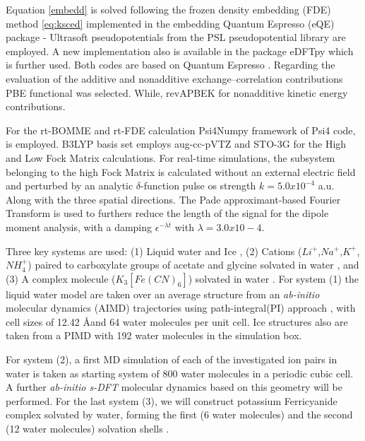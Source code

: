 \documentclass[notitlepage,12pt]{report}
\begin{document}
Equation \ref{embedd} is solved following the frozen density embedding (FDE) method \ref{eq:ksced} implemented in the embedding Quantum Espresso (eQE) package \supercite{genova2017eqe}- Ultrasoft pseudopotentials from the PSL pseudopotential library \supercite{corso2014comput} are employed. A new implementation also is available in the package eDFTpy\supercite{edftpy} which is further used. Both codes are based on Quantum Espresso \supercite{qe}. Regarding the evaluation of the additive and nonadditive exchange--correlation contributions PBE functional \supercite{perdew1996phys} was selected. While, revAPBEK \supercite{laricchia2011generalized} for nonadditive kinetic energy contributions. 

For the rt-BOMME and rt-FDE calculation Psi4Numpy\supercite{smith2018psi4numpy} framework of Psi4 code\supercite{smith2020psi4}, is employed. B3LYP basis set employs aug-cc-pVTZ and STO-3G for the High and Low Fock Matrix calculations. For real-time simulations, the subsystem belonging to the high Fock Matrix is calculated without an external electric field and perturbed by an analytic $\delta$-function pulse os strength $k=5.0x10^{-4}$ a.u. Along with the three spatial directions. The Pade approximant-based Fourier Transform is used to furthers reduce the length of the signal for the dipole moment analysis, with a damping $\epsilon^{-\lambda \dot{t}}$ with $\lambda=3.0x10-4$. 

Three key systems are used: (1) Liquid water\supercite{gaiduk2018electron} and Ice \supercite{bergmann2007nearest,zhovtobriukh2019x}, (2) Cations ($Li^{+}$,$Na^{+}$,$K^{+}$,$NH_4^{+}$) paired to carboxylate groups of acetate and glycine solvated in water \supercite{aziz2008cation}, and (3) A complex molecule ($K_3[Fe(CN)_6]$) solvated in water \supercite{zheng2018enabling}. For system (1) the liquid water model are taken over an average structure from an \textit{ab-initio} molecular dynamics (AIMD) trajectories using path-integral(PI) approach \supercite{gaiduk2018electron}, with cell sizes of 12.42 \AA and 64 water molecules per unit cell.  Ice structures also are taken from a PIMD with 192 water molecules in the simulation box\supercite{leetmaa2010theoretical}. 

For system (2), a first MD simulation of each of the investigated ion pairs in water is taken as starting system \supercite{aziz2008cation} of 800 water molecules in a periodic cubic cell. A further \textit{ab-initio s-DFT} molecular dynamics\supercite{genova2016avoiding} based on this geometry will be performed.  For the last system (3), we will construct potassium Ferricyanide complex solvated by water, forming the first (6 water molecules) and the second (12 water molecules) solvation shells \supercite{uudsemaa2003density,seidel2011valence}. 
\end{document}
